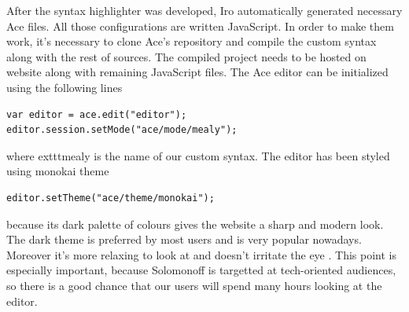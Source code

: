 After the syntax highlighter was developed, Iro automatically generated necessary Ace files. All those configurations are written JavaScript. In order to make them work, it's necessary to clone Ace's repository and compile the custom syntax along with the rest of sources. The compiled project needs to be hosted on website along with remaining JavaScript files. The Ace editor can be initialized using the following lines
\begin{lstlisting}
var editor = ace.edit("editor");
editor.session.setMode("ace/mode/mealy");
\end{lstlisting}
where     exttt{mealy} is the name of our custom syntax.
The editor has been styled using monokai theme
\begin{lstlisting}
editor.setTheme("ace/theme/monokai");
\end{lstlisting}
because its dark palette of colours gives the website a sharp and modern look. The dark theme is preferred by most users and is very popular nowadays. Moreover it's more relaxing to look at and doesn't irritate the eye \cite{syntax_highlighter}. This point is especially important, because Solomonoff is targetted at tech-oriented audiences, so there is a good chance that our users will spend many hours looking at the editor. 

